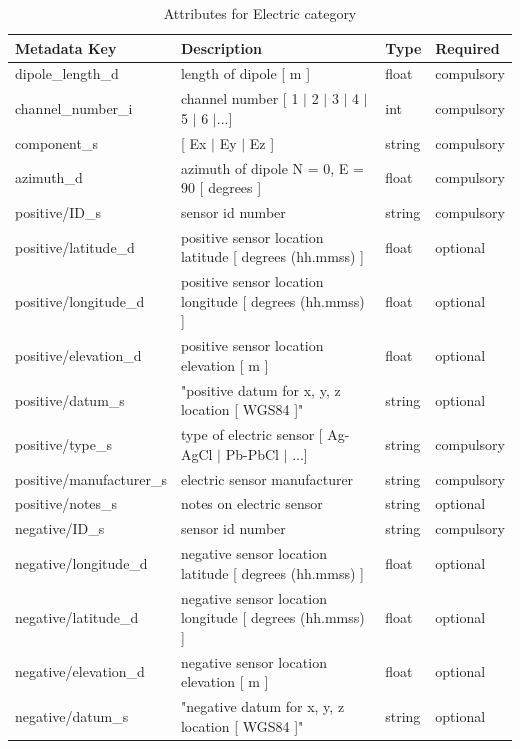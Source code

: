 \documentclass{article}
\begin{document}
\begin{table}[htb!]
	\caption[Attributes for Electric Channel]{Attributes for Electric category}
	\begin{tabular}{|l|p{3in}|l|l|}
		\hline
		\textbf{Metadata Key} & \textbf{Description} & \textbf{Type} & \textbf{Required} \\ \hline
		dipole\_length\_d & length of dipole [ m ] & float & compulsory \\ \hline
		channel\_number\_i & channel number [ 1 $|$ 2 $|$ 3 $|$ 4 $|$ 5 $|$ 6 $|$...] & int & compulsory \\ \hline
		component\_s & [ Ex $|$ Ey $|$ Ez ] & string  & compulsory \\ \hline
		azimuth\_d & azimuth of dipole N = 0,  E = 90 [ degrees ] & float & compulsory \\ \hline
		positive/ID\_s & sensor id number & string & compulsory \\ \hline
		positive/latitude\_d & positive sensor location latitude [ degrees (hh.mmss) ] & float & optional \\ \hline
		positive/longitude\_d & positive sensor location longitude [ degrees (hh.mmss) ] & float & optional \\ \hline
		positive/elevation\_d & positive sensor location elevation [ m ] & float & optional \\ \hline
		positive/datum\_s & "positive datum for x, y, z location [ WGS84 ]" & string & optional \\ \hline
		positive/type\_s & type of electric sensor [ Ag-AgCl $|$ Pb-PbCl $|$ ...] & string & compulsory \\ \hline
		positive/manufacturer\_s & electric sensor manufacturer & string & compulsory \\ \hline
		positive/notes\_s & notes on electric sensor & string & optional \\ \hline
		negative/ID\_s & sensor id number & string & compulsory \\ \hline
		negative/longitude\_d & negative sensor location latitude [ degrees (hh.mmss) ] & float & optional \\ \hline
		negative/latitude\_d & negative sensor location longitude [ degrees (hh.mmss) ] & float & optional \\ \hline
		negative/elevation\_d & negative sensor location elevation [ m ] & float & optional \\ \hline
		negative/datum\_s & "negative datum for x, y, z location [ WGS84 ]" & string & optional \\ \hline

\end{tabular}
\end{table}
\end{document}
